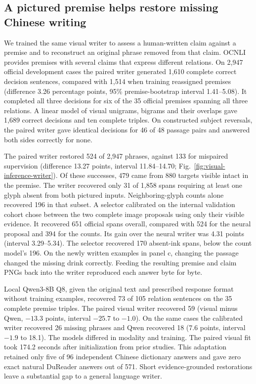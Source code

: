 \subsection*{A pictured premise helps restore missing Chinese writing}
We trained the same visual writer to assess a human-written claim against a premise and to reconstruct an original phrase removed from that claim. OCNLI provides premises with several claims that express different relations\cite{ocnli}. On 2,947 official development cases the paired writer generated 1,610 complete correct decision sentences, compared with 1,514 when training reassigned premises (difference 3.26 percentage points, 95\% premise-bootstrap interval 1.41--5.08). It completed all three decisions for six of the 35 official premises spanning all three relations. A linear model of visual unigrams, bigrams and their overlaps gave 1,689 correct decisions and ten complete triples. On constructed subject reversals, the paired writer gave identical decisions for 46 of 48 passage pairs and answered both sides correctly for none.

The paired writer restored 524 of 2,947 phrases, against 133 for mispaired supervision (difference 13.27 points, interval 11.84--14.70; Fig.~\ref{fig:visual-inference-writer}). Of these successes, 479 came from 880 targets visible intact in the premise. The writer recovered only 31 of 1,858 spans requiring at least one glyph absent from both pictured inputs. Neighboring-glyph counts alone recovered 196 in that subset. A selector calibrated on the internal validation cohort chose between the two complete image proposals using only their visible evidence. It recovered 651 official spans overall, compared with 524 for the neural proposal and 394 for the counts. Its gain over the neural writer was 4.31 points (interval 3.29--5.34). The selector recovered 170 absent-ink spans, below the count model's 196. On the newly written examples in panel c, changing the passage changed the missing drink correctly. Feeding the resulting premise and claim PNGs back into the writer reproduced each answer byte for byte.

Local Qwen3-8B Q8, given the original text and prescribed response format without training examples, recovered 73 of 105 relation sentences on the 35 complete premise triples. The paired visual writer recovered 59 (visual minus Qwen, $-13.3$ points, interval $-25.7$ to $-1.0$). On the same cases the calibrated writer recovered 26 missing phrases and Qwen recovered 18 (7.6 points, interval $-1.9$ to 18.1). The models differed in modality and training. The paired visual fit took 174.2 seconds after initialization from prior studies. This adaptation retained only five of 96 independent Chinese dictionary answers and gave zero exact natural DuReader answers out of 571. Short evidence-grounded restorations leave a substantial gap to a general language writer.
